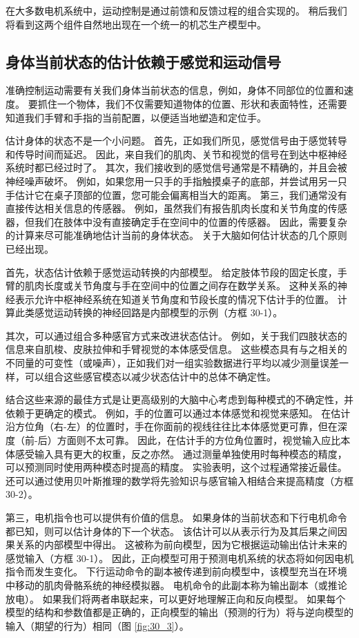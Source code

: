在大多数电机系统中，运动控制是通过前馈和反馈过程的组合实现的。 稍后我们将看到这两个组件自然地出现在一个统一的机芯生产模型中。


\subsection{身体当前状态的估计依赖于感觉和运动信号}

准确控制运动需要有关我们身体当前状态的信息，例如，身体不同部位的位置和速度。 要抓住一个物体，我们不仅需要知道物体的位置、形状和表面特性，还需要知道我们手臂和手指的当前配置，以便适当地塑造和定位手。

估计身体的状态不是一个小问题。 首先，正如我们所见，感觉信号由于感觉转导和传导时间而延迟。 因此，来自我们的肌肉、关节和视觉的信号在到达中枢神经系统时都已经过时了。 其次，我们接收到的感觉信号通常是不精确的，并且会被神经噪声破坏。 例如，如果您用一只手的手指触摸桌子的底部，并尝试用另一只手估计它在桌子顶部的位置，您可能会偏离相当大的距离。 第三，我们通常没有直接传达相关信息的传感器。 例如，虽然我们有报告肌肉长度和关节角度的传感器，但我们在肢体中没有直接确定手在空间中的位置的传感器。 因此，需要复杂的计算来尽可能准确地估计当前的身体状态。 关于大脑如何估计状态的几个原则已经出现。

首先，状态估计依赖于感觉运动转换的内部模型。 给定肢体节段的固定长度，手臂的肌肉长度或关节角度与手在空间中的位置之间存在数学关系。 这种关系的神经表示允许中枢神经系统在知道关节角度和节段长度的情况下估计手的位置。 计算此类感觉运动转换的神经回路是内部模型的示例（方框 30-1）。

其次，可以通过组合多种感官方式来改进状态估计。 例如，关于我们四肢状态的信息来自肌梭、皮肤拉伸和手臂视觉的本体感受信息。 这些模态具有与之相关的不同量的可变性（或噪声），正如我们对一组实验数据进行平均以减少测量误差一样，可以组合这些感官模态以减少状态估计中的总体不确定性。

结合这些来源的最佳方式是让更高级别的大脑中心考虑到每种模式的不确定性，并依赖于更确定的模式。 例如，手的位置可以通过本体感觉和视觉来感知。 在估计沿方位角（右-左）的位置时，手在你面前的视线往往比本体感觉更可靠，但在深度（前-后）方面则不太可靠。 因此，在估计手的方位角位置时，视觉输入应比本体感受输入具有更大的权重，反之亦然。 通过测量单独使用时每种模态的精度，可以预测同时使用两种模态时提高的精度。 实验表明，这个过程通常接近最佳。 还可以通过使用贝叶斯推理的数学将先验知识与感官输入相结合来提高精度（方框 30-2）。

第三，电机指令也可以提供有价值的信息。 如果身体的当前状态和下行电机命令都已知，则可以估计身体的下一个状态。 该估计可以从表示行为及其后果之间因果关系的内部模型中得出。 这被称为前向模型，因为它根据运动输出估计未来的感觉输入（方框 30-1）。 因此，正向模型可用于预测电机系统的状态将如何因电机指令而发生变化。 下行运动命令的副本被传递到前向模型中，该模型充当在环境中移动的肌肉骨骼系统的神经模拟器。 电机命令的此副本称为输出副本（或推论放电）。 如果我们将两者串联起来，可以更好地理解正向和反向模型。 
如果每个模型的结构和参数值都是正确的，正向模型的输出（预测的行为）将与逆向模型的输入（期望的行为）相同（图 \ref{fig:30_3}）。


